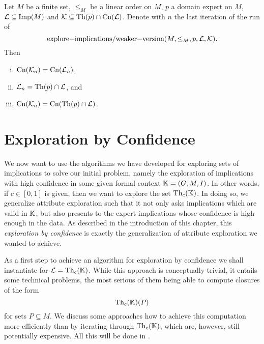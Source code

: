 \begin{Theorem}
  \label{thm:explore-implications-weaker-version-all-other-properties}
  Let $M$ be a finite set, $\leq_{M}$ be a linear order on $M$, $p$ a domain expert on
  $M$, $\mathcal{L} \subseteq \operatorname{Imp}(M)$ and $\mathcal{K} \subseteq \operatorname{Th}(p) \cap
  \operatorname{Cn}(\mathcal{L})$.  Denote with $n$ the last iteration of the run of
  \begin{equation*}
    \text{\lstinline{explore-implications/weaker-version}}(M, \leq_{M}, p, \mathcal{L}, \mathcal{K}).
  \end{equation*}
  Then
  \begin{enumerate}[i. ]
  \item $\operatorname{Cn}(\mathcal{K}_{n}) = \operatorname{Cn}(\mathcal{L}_{n})$,
  \item $\mathcal{L}_{n} = \operatorname{Th}(p) \cap \mathcal{L}$, and
  \item $\operatorname{Cn}(\mathcal{K}_{n}) = \operatorname{Cn}(\operatorname{Th}(p) \cap \mathcal{L})$.
  \end{enumerate}
\end{Theorem}

\section{Exploration by Confidence}
\label{sec:expl-conf}

We now want to use the algorithms we have developed for exploring sets of implications to
solve our initial problem, namely the exploration of implications with high confidence in
some given formal context ${\mathbb{K}} = (G, M, I)$.  In other words, if $c \in [0,1]$ is
given, then we want to explore the set $\operatorname{Th}_{c}({\mathbb{K}})$.  In doing so, we generalize
attribute exploration such that it not only asks implications which are valid in ${\mathbb{K}}$,
but also presents to the expert implications whose confidence is high enough in the data.
As described in the introduction of this chapter, this \emph{exploration by confidence} is
exactly the generalization of attribute exploration we wanted to achieve.

As a first step to achieve an algorithm for exploration by confidence we shall instantiate
 for $\mathcal{L} = \operatorname{Th}_{c}({\mathbb{K}})$.  While this approach
is conceptually trivial, it entails some technical problems, the most serious of them
being able to compute closures of the form
\begin{equation*}
  \operatorname{Th}_{c}({\mathbb{K}})(P)
\end{equation*}
for sets $P \subseteq M$.  We discuss some approaches how to achieve this computation more
efficiently than by iterating through $\operatorname{Th}_{c}({\mathbb{K}})$, which are, however, still
potentially expensive.  All this will be done in .

